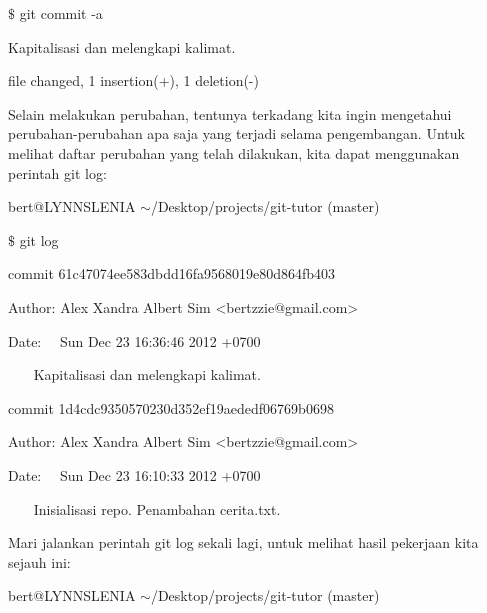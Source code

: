 {\fontsize{10pt}{10pt}\selectfont  $  \$  $ git commit -a} \par
{\fontsize{10pt}{10pt}\selectfont [master 61c4707] Kapitalisasi dan melengkapi kalimat.} \par
{\fontsize{10pt}{10pt} file changed, 1 insertion(+), 1 deletion(-)} \par
\vspace{12pt}
Selain melakukan perubahan, tentunya terkadang kita ingin mengetahui perubahan-perubahan apa saja yang terjadi selama pengembangan. Untuk melihat daftar perubahan yang telah dilakukan, kita dapat menggunakan perintah git log: \par
\noindent 
{\fontsize{10pt}{10pt}\selectfont bert@LYNNSLENIA  $  \sim  $/Desktop/projects/git-tutor (master)} \par
\noindent 
{\fontsize{10pt}{10pt}\selectfont  $  \$  $ git log} \par
\noindent 
{\fontsize{10pt}{10pt}\selectfont commit 61c47074ee583dbdd16fa9568019e80d864fb403} \par
\noindent 
{\fontsize{10pt}{10pt}\selectfont Author: Alex Xandra Albert Sim <bertzzie@gmail.com>} \par
\noindent 
{\fontsize{10pt}{10pt}\selectfont Date:~~ Sun Dec 23 16:36:46 2012 +0700} \par
\noindent 
\vspace{10pt}
\noindent 
{\fontsize{10pt}{10pt}\selectfont ~~~ Kapitalisasi dan melengkapi kalimat.} \par
\noindent 
\vspace{10pt}
\noindent 
{\fontsize{10pt}{10pt}\selectfont commit 1d4cdc9350570230d352ef19aededf06769b0698} \par
\noindent 
{\fontsize{10pt}{10pt}\selectfont Author: Alex Xandra Albert Sim <bertzzie@gmail.com>} \par
\noindent 
{\fontsize{10pt}{10pt}\selectfont Date:~~ Sun Dec 23 16:10:33 2012 +0700} \par
\noindent 
\vspace{10pt}
\noindent 
{\fontsize{10pt}{10pt}\selectfont ~~~ Inisialisasi repo. Penambahan cerita.txt.} \par
\vspace{12pt}
\noindent 
Mari jalankan perintah git log sekali lagi, untuk melihat hasil pekerjaan kita sejauh ini: \par
\noindent 
{\fontsize{10pt}{10pt}\selectfont bert@LYNNSLENIA  $  \sim  $/Desktop/projects/git-tutor (master)} \par
\noindent 
